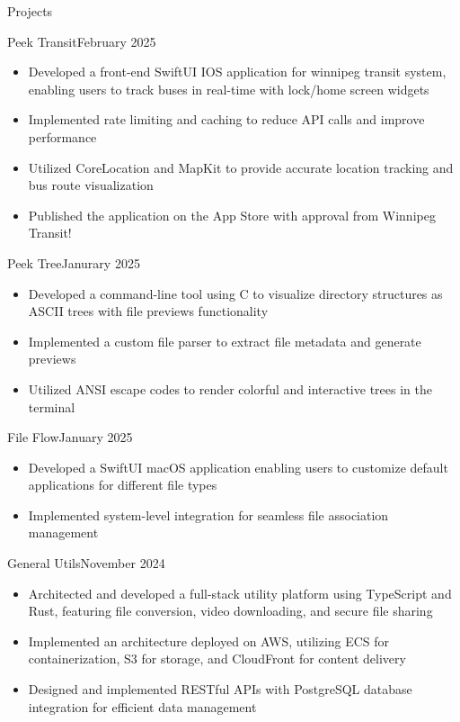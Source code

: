 \documentclass{article}
\newlength{\tabin}
\newlength{\secsep}
\newcommand{\lineunder}{\vspace*{-8pt} \\ \hspace*{-6pt} \hrulefill \\ \vspace*{-15pt}}
\newenvironment{tabbedsection}[1]{
	\begin{list}{}{
		\setlength{\itemsep}{0pt}
		\setlength{\labelsep}{0pt}
		\setlength{\labelwidth}{0pt}
		\setlength{\leftmargin}{\tabin}
		\setlength{\rightmargin}{\tabin}
		\setlength{\listparindent}{0pt}
		\setlength{\parsep}{0pt}
		\setlength{\parskip}{0pt}
		\setlength{\partopsep}{0pt}
		\setlength{\topsep}{#1}
	}
		\item[]
		}{
	\end{list}}
\newenvironment{resume_section}[1]{
	\vspace{2\secsep}
	\textsc{\large#1}
	\lineunder
	\begin{tabbedsection}{\secsep}
	}{\end{tabbedsection}}
\newenvironment{resume_subsection}[2]{
	\filbreak
	\begin{minipage}[t]{0.75\linewidth}
		\textbf{#1}
	\end{minipage}%
	\begin{minipage}[t]{0.25\linewidth}
		\hfill \footnotesize #2
	\end{minipage}
	\begin{tabbedsection}{0.5\secsep}
	}{\end{tabbedsection}}
\newenvironment{subitems}{
	\renewcommand{\labelitemi}{-}
	\begin{itemize}
		\setlength{\labelsep}{1em}
		}{
	\end{itemize}}
\begin{document}
	\begin{resume_section}{Projects}
		
		\begin{resume_subsection}{Peek Transit}{February 2025}
			\begin{subitems}
				\item Developed a front-end SwiftUI IOS application for winnipeg transit system, enabling users to
				track buses in real-time with lock/home screen widgets
				\item Implemented rate limiting and caching to reduce API calls and improve performance
				\item Utilized CoreLocation and MapKit to provide accurate location tracking and bus route visualization
				\item Published the application on the App Store with approval from Winnipeg Transit!
			\end{subitems}
		\end{resume_subsection}
		
		\begin{resume_subsection}{Peek Tree}{Janurary 2025}
			\begin{subitems}
				\item Developed a command-line tool using C to visualize directory structures as ASCII trees with file previews functionality
				\item Implemented a custom file parser to extract file metadata and generate previews
				\item Utilized ANSI escape codes to render colorful and interactive trees in the terminal
			\end{subitems}
		\end{resume_subsection}
		
		\begin{resume_subsection}{File Flow}{January 2025}
			\begin{subitems}
				\item Developed a SwiftUI macOS application enabling users to customize default applications for different file types
				\item Implemented system-level integration for seamless file association management
			\end{subitems}
		\end{resume_subsection}
		
		\begin{resume_subsection}{General Utils}{November 2024}
			\begin{subitems}
				\item Architected and developed a full-stack utility platform using TypeScript and Rust, featuring file conversion, video downloading, and secure file sharing
				\item Implemented an architecture deployed on AWS, utilizing ECS for containerization, S3 for storage, and CloudFront for content delivery
				\item Designed and implemented RESTful APIs with PostgreSQL database integration for efficient data management
			\end{subitems}
		\end{resume_subsection}
		

\end{resume_section}
\end{document}
